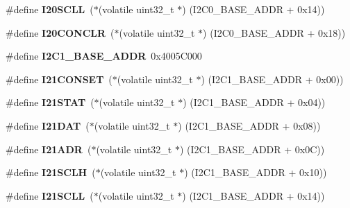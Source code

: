 \begin{DoxyCompactItemize}
\#define {\bfseries I20\+S\+C\+LL}~($\ast$(volatile uint32\+\_\+t $\ast$) (I2\+C0\+\_\+\+B\+A\+S\+E\+\_\+\+A\+D\+DR + 0x14))
\item 
\mbox{\label{group__lpc24xx__regs_ga6e0b0e63d0f7699f0ff3be29483604dd}} 
\#define {\bfseries I20\+C\+O\+N\+C\+LR}~($\ast$(volatile uint32\+\_\+t $\ast$) (I2\+C0\+\_\+\+B\+A\+S\+E\+\_\+\+A\+D\+DR + 0x18))
\item 
\mbox{\label{group__lpc24xx__regs_ga1ee2ead8ad06cf308542ac7d8d4be581}} 
\#define {\bfseries I2\+C1\+\_\+\+B\+A\+S\+E\+\_\+\+A\+D\+DR}~0x4005\+C000
\item 
\mbox{\label{group__lpc24xx__regs_gaa77d71a046661afcd36d0fed44897b4a}} 
\#define {\bfseries I21\+C\+O\+N\+S\+ET}~($\ast$(volatile uint32\+\_\+t $\ast$) (I2\+C1\+\_\+\+B\+A\+S\+E\+\_\+\+A\+D\+DR + 0x00))
\item 
\mbox{\label{group__lpc24xx__regs_gaf8ad3be4776b7c72e40152629c8dfb84}} 
\#define {\bfseries I21\+S\+T\+AT}~($\ast$(volatile uint32\+\_\+t $\ast$) (I2\+C1\+\_\+\+B\+A\+S\+E\+\_\+\+A\+D\+DR + 0x04))
\item 
\mbox{\label{group__lpc24xx__regs_ga25ee5eeb2e9a66c4cd60ed0db2677e12}} 
\#define {\bfseries I21\+D\+AT}~($\ast$(volatile uint32\+\_\+t $\ast$) (I2\+C1\+\_\+\+B\+A\+S\+E\+\_\+\+A\+D\+DR + 0x08))
\item 
\mbox{\label{group__lpc24xx__regs_ga487f130a95aa32fc361b570f1698a94b}} 
\#define {\bfseries I21\+A\+DR}~($\ast$(volatile uint32\+\_\+t $\ast$) (I2\+C1\+\_\+\+B\+A\+S\+E\+\_\+\+A\+D\+DR + 0x0\+C))
\item 
\mbox{\label{group__lpc24xx__regs_ga64bd322e12afaad507d8b26f63b44339}} 
\#define {\bfseries I21\+S\+C\+LH}~($\ast$(volatile uint32\+\_\+t $\ast$) (I2\+C1\+\_\+\+B\+A\+S\+E\+\_\+\+A\+D\+DR + 0x10))
\item 
\mbox{\label{group__lpc24xx__regs_ga3c58f4c42bdbed43705d432f38d034c1}} 
\#define {\bfseries I21\+S\+C\+LL}~($\ast$(volatile uint32\+\_\+t $\ast$) (I2\+C1\+\_\+\+B\+A\+S\+E\+\_\+\+A\+D\+DR + 0x14))
\item 

\end{DoxyCompactItemize}
